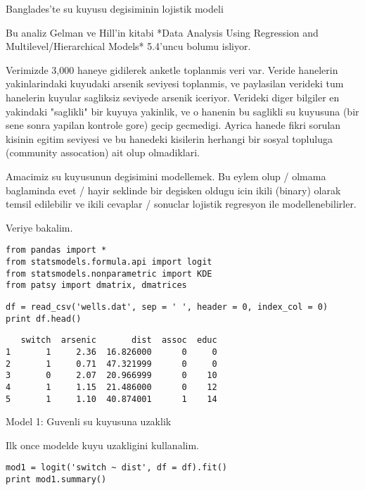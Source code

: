 \documentclass[12pt,fleqn]{article}\usepackage{../common}
\begin{document}
Banglades'te su kuyusu degisiminin lojistik modeli

Bu analiz Gelman ve Hill'in kitabi *Data Analysis Using Regression and
Multilevel/Hierarchical Models* 5.4'uncu bolumu isliyor.

Verimizde 3,000 haneye gidilerek anketle toplanmis veri var. Veride
hanelerin yakinlarindaki kuyudaki arsenik seviyesi toplanmis, ve
paylasilan verideki tum hanelerin kuyular sagliksiz seviyede arsenik
iceriyor. Verideki diger bilgiler en yakindaki "saglikli" bir kuyuya
yakinlik, ve o hanenin bu saglikli su kuyusuna (bir sene sonra yapilan
kontrole gore) gecip gecmedigi.  Ayrica hanede fikri sorulan kisinin
egitim seviyesi ve bu hanedeki kisilerin herhangi bir sosyal topluluga
(community assocation) ait olup olmadiklari.

Amacimiz su kuyusunun degisimini modellemek. Bu eylem olup / olmama baglaminda
evet / hayir seklinde bir degisken oldugu icin ikili (binary) olarak
temsil edilebilir ve ikili cevaplar / sonuclar lojistik regresyon ile
modellenebilirler.

Veriye bakalim.

\begin{verbatim}
from pandas import *
from statsmodels.formula.api import logit
from statsmodels.nonparametric import KDE
from patsy import dmatrix, dmatrices
\end{verbatim}

\begin{verbatim}
df = read_csv('wells.dat', sep = ' ', header = 0, index_col = 0)
print df.head()
\end{verbatim}

\begin{verbatim}
   switch  arsenic       dist  assoc  educ
1       1     2.36  16.826000      0     0
2       1     0.71  47.321999      0     0
3       0     2.07  20.966999      0    10
4       1     1.15  21.486000      0    12
5       1     1.10  40.874001      1    14
\end{verbatim}

Model 1: Guvenli su kuyusuna uzaklik

Ilk once modelde kuyu uzakligini kullanalim. 

\begin{verbatim}
mod1 = logit('switch ~ dist', df = df).fit()
print mod1.summary()
\end{verbatim}
\end{document}

